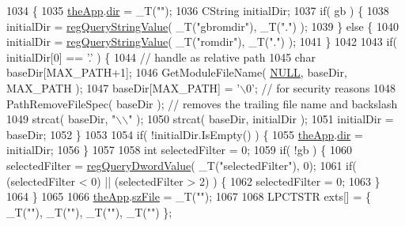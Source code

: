 \begin{DoxyCode}
1034 \{
1035     \mbox{\hyperlink{_v_b_a_8cpp_a8095a9d06b37a7efe3723f3218ad8fb3}{theApp}}.\mbox{\hyperlink{class_v_b_a_a7177c0b51e84b91c6027ea73461c457e}{dir}} = \_T(\textcolor{stringliteral}{""});
1036     CString initialDir;
1037     \textcolor{keywordflow}{if}( gb ) \{
1038         initialDir = \mbox{\hyperlink{_reg_8cpp_a618826d274df0d9c19fab2ff28bd9008}{regQueryStringValue}}( \_T(\textcolor{stringliteral}{"gbromdir"}), \_T(\textcolor{stringliteral}{"."}) );
1039     \} \textcolor{keywordflow}{else} \{
1040         initialDir = \mbox{\hyperlink{_reg_8cpp_a618826d274df0d9c19fab2ff28bd9008}{regQueryStringValue}}( \_T(\textcolor{stringliteral}{"romdir"}), \_T(\textcolor{stringliteral}{"."}) );
1041     \}
1042     
1043     \textcolor{keywordflow}{if}( initialDir[0] == \textcolor{charliteral}{'.'} ) \{
1044         \textcolor{comment}{// handle as relative path}
1045         \textcolor{keywordtype}{char} baseDir[MAX\_PATH+1];
1046         GetModuleFileName( \mbox{\hyperlink{getopt1_8c_a070d2ce7b6bb7e5c05602aa8c308d0c4}{NULL}}, baseDir, MAX\_PATH );
1047         baseDir[MAX\_PATH] = \textcolor{charliteral}{'\(\backslash\)0'}; \textcolor{comment}{// for security reasons}
1048         PathRemoveFileSpec( baseDir ); \textcolor{comment}{// removes the trailing file name and backslash}
1049         strcat( baseDir, \textcolor{stringliteral}{"\(\backslash\)\(\backslash\)"} );
1050         strcat( baseDir, initialDir );
1051         initialDir = baseDir;
1052     \}
1053 
1054     \textcolor{keywordflow}{if}( !initialDir.IsEmpty() ) \{
1055         \mbox{\hyperlink{_v_b_a_8cpp_a8095a9d06b37a7efe3723f3218ad8fb3}{theApp}}.\mbox{\hyperlink{class_v_b_a_a7177c0b51e84b91c6027ea73461c457e}{dir}} = initialDir;
1056     \}
1057 
1058     \textcolor{keywordtype}{int} selectedFilter = 0;
1059     \textcolor{keywordflow}{if}( !gb ) \{
1060         selectedFilter = \mbox{\hyperlink{_reg_8cpp_a150640889ffff4851ee26d7b999ec7c3}{regQueryDwordValue}}( \_T(\textcolor{stringliteral}{"selectedFilter"}), 0);
1061         \textcolor{keywordflow}{if}( (selectedFilter < 0) || (selectedFilter > 2) ) \{
1062             selectedFilter = 0;
1063         \}
1064     \}
1065     
1066     \mbox{\hyperlink{_v_b_a_8cpp_a8095a9d06b37a7efe3723f3218ad8fb3}{theApp}}.\mbox{\hyperlink{class_v_b_a_ac85720ef4e00c5455be15266b7119045}{szFile}} = \_T(\textcolor{stringliteral}{""});
1067     
1068     LPCTSTR exts[] = \{ \_T(\textcolor{stringliteral}{""}), \_T(\textcolor{stringliteral}{""}), \_T(\textcolor{stringliteral}{""}), \_T(\textcolor{stringliteral}{""}) \};

\end{DoxyCode}
